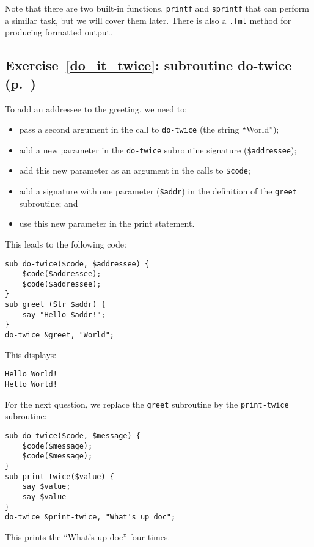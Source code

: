 Note that there are two built-in functions, {\tt printf} and 
{\tt sprintf} that can perform a similar task, but we will 
cover them later. There is also a \verb'.fmt' method for 
producing formatted output.

\subsection{Exercise~\ref{do_it_twice}: subroutine do-twice (p.~\pageref{do_it_twice})}
\label{sol_do_it_twice}

To add an addressee to the greeting, we need to:
\begin{itemize}
\item pass a second argument in the call to 
{\tt do-twice} (the string ``World'');
\item add a new parameter in the {\tt do-twice} subroutine 
signature (\verb'$addressee');
\item add this new parameter as an argument in the calls 
to \verb'$code';
\item add a signature with one parameter (\verb'$addr') in 
the definition of the {\tt greet} subroutine; and 
\item use this new parameter in the print statement.
\end{itemize} 

This leads to the following code:

\begin{verbatim}
sub do-twice($code, $addressee) {
    $code($addressee); 
    $code($addressee);
}
sub greet (Str $addr) {
    say "Hello $addr!";
}
do-twice &greet, "World";
\end{verbatim}

This displays:

\begin{verbatim}
Hello World!
Hello World!
\end{verbatim}

For the next question, we replace the {\tt greet} subroutine 
by the {\tt print-twice} subroutine:

\begin{verbatim}
sub do-twice($code, $message) {
    $code($message); 
    $code($message);
}
sub print-twice($value) {
    say $value;
    say $value
}
do-twice &print-twice, "What's up doc";
\end{verbatim}

This prints the ``What's up doc'' four times.

